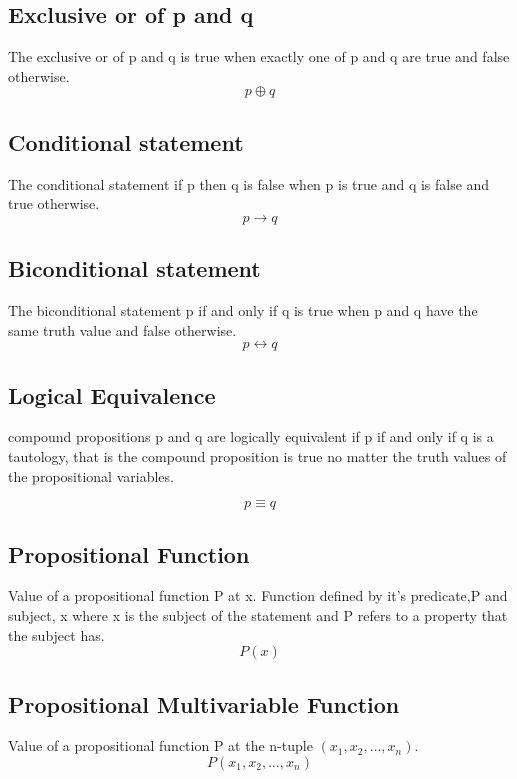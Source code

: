 \documentclass[12pt]{article}
\begin{document}
\subsection{Exclusive or of p and q}
The exclusive or of p and q
is true
when
exactly one of p and q are true
and false otherwise.
\begin{equation}
p \oplus q
\end{equation}

\subsection{Conditional statement}
The conditional statement if p then q
is false
when
p is true and q is false
and true otherwise.
\begin{equation}
p \rightarrow q
\end{equation}

\subsection{Biconditional statement}
The biconditional statement p if and only if q
is true
when
p and q have the same truth value
and false otherwise.
\begin{equation}
p \leftrightarrow q
\end{equation}

\subsection{Logical Equivalence}
compound propositions p and q are logically equivalent if 
p if and only if q is a tautology,
that is the compound proposition is true 
no matter the truth values of the propositional variables.

\begin{equation}
p \equiv q
\end{equation}

\subsection{Propositional Function}
Value of a propositional function P at x.
Function defined by it's predicate,P and subject, x
where
x is the subject of the statement and
P refers to a property that the subject has.
\begin{equation}
P(x)
\end{equation}

\subsection{Propositional Multivariable Function}
Value of a propositional function P at the n-tuple $(x_{1},x_{2},\dots,x_{n})$.
\begin{equation}
P(x_{1},x_{2},\dots,x_{n})
\end{equation}
\end{document}
